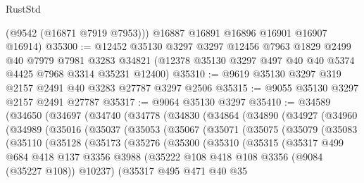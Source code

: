 \begin{lexlean}{RustStd}
\begin{coremodule}
        (@9542 (@16871 @7919 @7953)))
      @16887
      @16891
      @16896
      @16901
      @16907
      @16914)
@35300 := @12452
    @35130
    @3297
    @3297
    @12456
    @7963
    @1829
    @2499
    @40
    @7979
    @7981
    @3283
    @34821
    (@12378 @35130 @3297 @497 @40 @40 @5374 @4425 @7968 @3314 @35231 @12400)
@35310 := @9619 @35130 @3297 @319 @2157 @2491 @40 @3283 @27787 @3297 @2506
@35315 := @9055 @35130 @3297 @2157 @2491 @27787
@35317 := @9064 @35130 @3297
@35410 := @34589
    (@34650
      (@34697
        (@34740
          (@34778
            (@34830
              (@34864
                (@34890
                  (@34927
                    (@34960
                      (@34989
                        (@35016
                          (@35037
                            (@35053
                              (@35067
                                (@35071
                                  (@35075
                                    (@35079
                                      (@35083
                                        (@35110
                                          (@35128
                                            (@35173
                                              (@35276
                                                (@35300
                                                  (@35310
                                                    (@35315
                                                      (@35317
                                                        @499
                                                        @684
                                                        @418
                                                        @137
                                                        @3356
                                                        @3988
                                                        (@35222
                                                          @108
                                                          @418
                                                          @108
                                                          @3356
                                                          (@9084 (@35227 @108))
                                                          @10237)
                                                        (@35317
                                                          @495
                                                          @471
                                                          @40
                                                          @35

\end{coremodule}
\end{lexlean}
